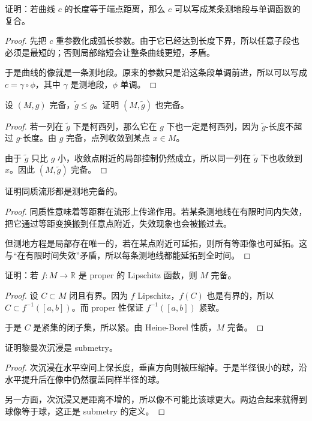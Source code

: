 \documentclass[11pt,a4paper,openany]{ctexbook}
\numberwithin{equation}{chapter}
\begin{document}
\begin{exercise}
证明：若曲线 \(c\) 的长度等于端点距离，那么 \(c\) 可以写成某条测地段与单调函数的复合。
\end{exercise}
\begin{proof}
先把 \(c\) 重参数化成弧长参数。由于它已经达到长度下界，所以任意子段也必须是最短的；否则局部缩短会让整条曲线更短，矛盾。

于是曲线的像就是一条测地段。原来的参数只是沿这条段单调前进，所以可以写成 \(c=\gamma\circ\phi\)，其中 \(\gamma\) 是测地段，\(\phi\) 单调。
\end{proof}

\begin{exercise}
设 \((M,g)\) 完备，\(\tilde g\le g\)。证明 \((M,\tilde g)\) 也完备。
\end{exercise}
\begin{proof}
若一列在 \(\tilde g\) 下是柯西列，那么它在 \(g\) 下也一定是柯西列，因为 \(\tilde g\)-长度不超过 \(g\)-长度。由 \(g\) 完备，点列收敛到某点 \(x\in M\)。

由于 \(\tilde g\) 只比 \(g\) 小，收敛点附近的局部控制仍然成立，所以同一列在 \(\tilde g\) 下也收敛到 \(x\)。因此 \((M,\tilde g)\) 完备。
\end{proof}

\begin{exercise}
证明同质流形都是测地完备的。
\end{exercise}
\begin{proof}
同质性意味着等距群在流形上传递作用。若某条测地线在有限时间内失效，把它通过等距变换搬到任意点附近，失效现象也会被搬过去。

但测地方程是局部存在唯一的，若在某点附近可延拓，则所有等距像也可延拓。这与“在有限时间失效”矛盾，所以每条测地线都能延拓到全时间。
\end{proof}

\begin{exercise}
证明：若 \(f\colon M\to\mathbb R\) 是 proper 的 Lipschitz 函数，则 \(M\) 完备。
\end{exercise}
\begin{proof}
设 \(C\subset M\) 闭且有界。因为 \(f\) Lipschitz，\(f(C)\) 也是有界的，所以 \(C\subset f^{-1}([a,b])\)。而 proper 性保证 \(f^{-1}([a,b])\) 紧致。

于是 \(C\) 是紧集的闭子集，所以紧。由 Heine-Borel 性质，\(M\) 完备。
\end{proof}

\begin{exercise}
证明黎曼次沉浸是 submetry。
\end{exercise}
\begin{proof}
次沉浸在水平空间上保长度，垂直方向则被压缩掉。于是半径很小的球，沿水平提升后在像中仍然覆盖同样半径的球。

另一方面，次沉浸又是距离不增的，所以像不可能比该球更大。两边合起来就得到球像等于球，这正是 submetry 的定义。
\end{proof}
\end{document}
